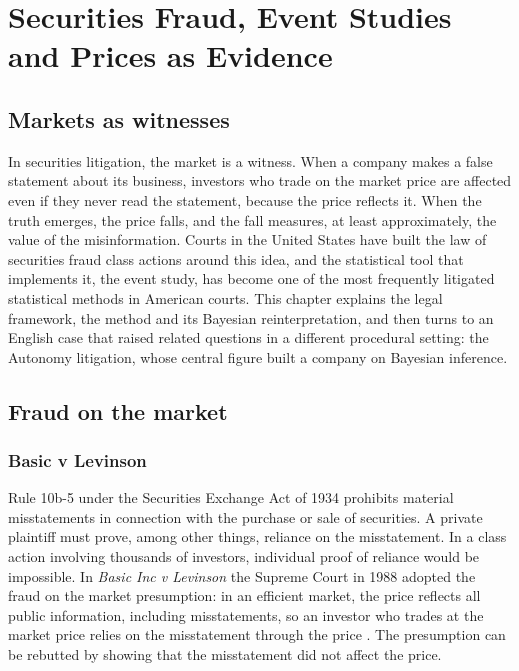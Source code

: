 \chapter{Securities Fraud, Event Studies and Prices as Evidence}
\label{ch:securities}

\section{Markets as witnesses}

In securities litigation, the market is a witness. When a company makes a false statement about its business, investors who trade on the market price are affected even if they never read the statement, because the price reflects it. When the truth emerges, the price falls, and the fall measures, at least approximately, the value of the misinformation. Courts in the United States have built the law of securities fraud class actions around this idea, and the statistical tool that implements it, the event study, has become one of the most frequently litigated statistical methods in American courts. This chapter explains the legal framework, the method and its Bayesian reinterpretation, and then turns to an English case that raised related questions in a different procedural setting: the Autonomy litigation, whose central figure built a company on Bayesian inference.

\section{Fraud on the market}

\subsection{Basic v Levinson}

Rule 10b-5 under the Securities Exchange Act of 1934 prohibits material misstatements in connection with the purchase or sale of securities. A private plaintiff must prove, among other things, reliance on the misstatement. In a class action involving thousands of investors, individual proof of reliance would be impossible. In \emph{Basic Inc v Levinson} the Supreme Court in 1988 adopted the fraud on the market presumption: in an efficient market, the price reflects all public information, including misstatements, so an investor who trades at the market price relies on the misstatement through the price \citep{basic1988}. The presumption can be rebutted by showing that the misstatement did not affect the price.

